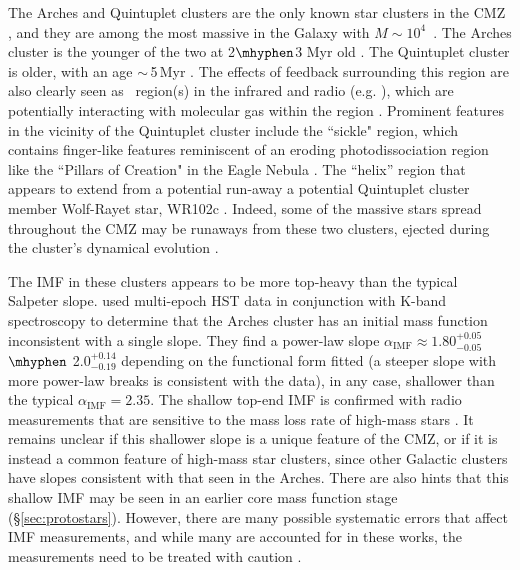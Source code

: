 The Arches and Quintuplet clusters are the only known star clusters in the CMZ
\citep[we leave out the Young Nuclear Cluster, YNC, as it is at $R<10$ pc and its formation mechanism is likely entirely different from these clusters, see e.g.][]{Genzel2010, Neumayer2020},
and they are among the most massive in the Galaxy with $M\sim10^4$~\msun.
The Arches cluster is the younger of the two at 2$\mhyphen$3 Myr old \citep{Lohr2018, Clark2019}.
The Quintuplet cluster is older, with an age $\sim$\,5\,Myr \citep{Liermann2012,Schneider2014,Rui2019}.
The effects of feedback surrounding this region are also clearly seen as \hii\ region(s) in the infrared and radio (e.g. \citealp{Lang2005,Hankins2020}), which are potentially interacting with molecular gas within the region \citep{Butterfield2018}.
Prominent features in the vicinity of the Quintuplet cluster include the ``sickle" region, which contains finger-like features reminiscent of an eroding photodissociation region like the ``Pillars of Creation" in the Eagle Nebula \citep{Hankins2020}. 
The ``helix” region that appears to extend from a potential run-away a potential Quintuplet cluster member Wolf-Rayet star, WR102c \citep{Lau2016,Steinke2016}. 
Indeed, some of the massive stars spread throughout the CMZ may be runaways from these two clusters, ejected during the cluster's dynamical evolution \citep{Habibi2014,Dong2015}.

The IMF in these clusters appears to be more top-heavy than the typical Salpeter slope.
\citet{Hosek2019} used multi-epoch HST data in conjunction with K-band spectroscopy to determine that the Arches cluster has an initial mass function inconsistent with a single slope.
They find a power-law slope $\alpha_\mathrm{IMF}\approx1.80^{+0.05}_{-0.05}$ $\mhyphen$ 2.0$^{+0.14}_{-0.19}$ depending on the functional form fitted (a steeper slope with more power-law breaks is consistent with the data), in any case, shallower than the typical $\alpha_\mathrm{IMF}=2.35$.
The shallow top-end IMF is confirmed with radio measurements that are sensitive to the mass loss rate of high-mass stars \citep{Gallego-Calvente2021a,Gallego-Calvente2021b}.
It remains unclear if this shallower slope is a unique feature of the CMZ, or if it is instead a common feature of high-mass star clusters, since other Galactic clusters \citep[e.g., Wd1, NGC 3603,][]{Pang2013,Lim2013,Andersen2017} have slopes consistent with that seen in the Arches.
There are also hints that this shallow IMF may be seen in an earlier core mass function stage (\S \ref{sec:protostars}).
However, there are many possible systematic errors that affect IMF measurements, and while many are accounted for in these works, the measurements need to be treated with caution \citep[e.g.][]{Bastian2010}. 


